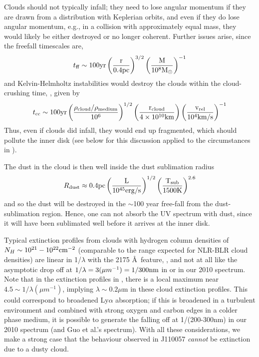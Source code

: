 \documentclass[11pt,a4paper]{article}
\begin{document}
Clouds should not typically infall; they need to lose angular momentum
if they are drawn from a distribution with Keplerian orbits, and even
if they do lose angular momentum, e.g., in a collision with
approximately equal mass, they would likely be either destroyed or no
longer coherent. Further issues 
arise, since the freefall timescales
are,
\begin{equation}
    t_{{\rm ff}}   \sim 100   \rm{yr}  \left(\frac{r}{0.4\rm{pc}}\right)^{3/2} 
                                            \left(\frac{M}{10^{8}M_{\odot}}\right)^{-1}
\end{equation}
and Kelvin-Helmholtz instabilities would destroy the clouds within the
cloud-crushing time, \citep[e.g., ][]{Nagakura2008, Hopkins2013,
Shiokawa2015, Bae2016},
given by
\begin{equation}
    t_{\rm cc} \sim 100\rm{yr} \left(\frac{\rho_{cloud}/\rho_{medium}}{10^{6}}\right)^{1/2} 
                                            \left(\frac{r_{\rm cloud}}{4 \times 10^{10}\rm{km}}\right) 
                                            \left(\frac{v_{\rm rel}}{10^{4}\rm{km/s}}\right)^{-1}
\end{equation}
Thus, even if clouds did infall, they would end up fragmented, which
should pollute the inner disk (see below for this discussion applied
to the circumstances in \citet{Guo2016}).

The dust in the cloud is then well inside the dust sublimation radius
\begin{equation}
    R_{\rm dust} \approx 0.4\rm{pc}\left(\frac{L}{10^{45}\rm{erg/s}}\right)^{1/2}
                                                   \left(\frac{T_{\rm sub}}{1500\rm{K}}\right)^{2.6}
\end{equation}
and so the dust will be destroyed in the $\sim$100 year free-fall from
the dust-sublimation region. Hence, one can not absorb the UV spectrum
with dust, since it will have been sublimated well before it arrives
at the inner disk.

Typical extinction profiles from clouds with hydrogen column densities
of $N_{H} \sim 10^{21}-10^{22} \rm{cm}^{-2}$ (comparable to the range
expected for NLR-BLR cloud densities) are linear in 
1/$\lambda$ with the 2175 \AA\ feature, \citep[e.g., Figure 4
of][]{Gordon2003}, and not at all like the asymptotic drop off at
$1/\lambda=3 (\mu m^{-1})=1/300\rm{nm}$ in \citet{Guo2016} or in our
2010 spectrum. Note that in the extinction profiles in
\citet{Gordon2003}, there is a local maximum near $4.5 \sim 1/\lambda (\mu
m^{-1})$, implying $\lambda \sim 0.2\mu$m in these
cloud extinction profiles. %
This could correspond to broadened Ly$\alpha$ absorption;
if this is broadened in a turbulent environment and combined with
strong oxygen and carbon edges in a colder phase medium, it is possible to
generate the falling off at 1/(200-300nm) in our 2010 spectrum (and
Guo et al.'s spectrum). With all these considerations, we make a strong case
that the behaviour observed in J110057 \emph{cannot} be extinction due
to a dusty cloud.
\end{document}
